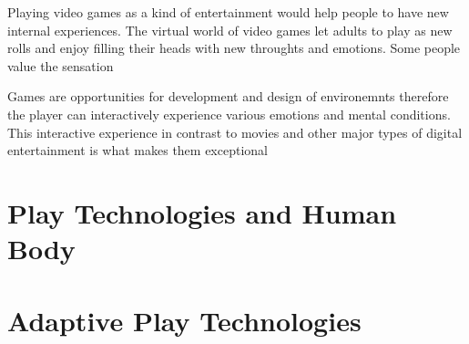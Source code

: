 Playing video games as a kind of entertainment would help people to have new internal 
experiences. The virtual world of video games let adults to play as new rolls and enjoy filling 
their heads with new throughts and emotions. Some people value 
the sensation

Games are opportunities for development and design of environemnts therefore 
the player can interactively experience various emotions and mental conditions.
This interactive experience in contrast to movies 
and other major types of digital entertainment is what makes them exceptional

\section{Play Technologies and Human Body}

\section{Adaptive Play Technologies}
